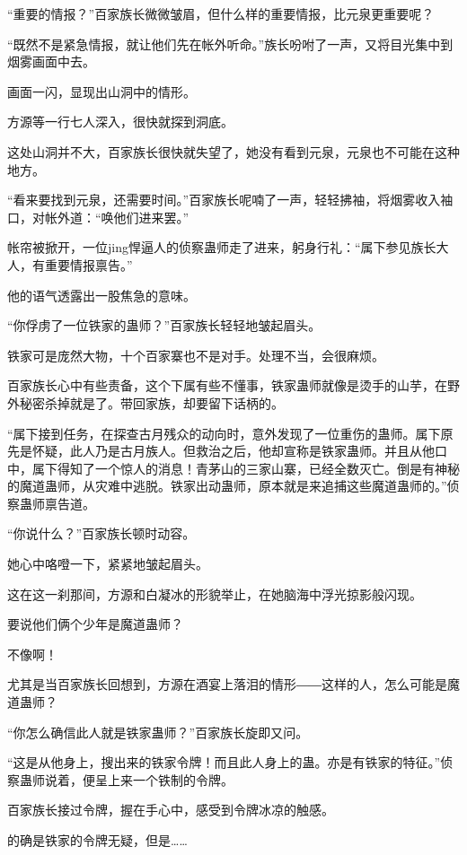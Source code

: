 
\begin{this_body}

“重要的情报？”百家族长微微皱眉，但什么样的重要情报，比元泉更重要呢？

“既然不是紧急情报，就让他们先在帐外听命。”族长吩咐了一声，又将目光集中到烟雾画面中去。

画面一闪，显现出山洞中的情形。

方源等一行七人深入，很快就探到洞底。

这处山洞并不大，百家族长很快就失望了，她没有看到元泉，元泉也不可能在这种地方。

“看来要找到元泉，还需要时间。”百家族长呢喃了一声，轻轻拂袖，将烟雾收入袖口，对帐外道：“唤他们进来罢。”

帐帘被掀开，一位jing悍逼人的侦察蛊师走了进来，躬身行礼：“属下参见族长大人，有重要情报禀告。”

他的语气透露出一股焦急的意味。

“你俘虏了一位铁家的蛊师？”百家族长轻轻地皱起眉头。

铁家可是庞然大物，十个百家寨也不是对手。处理不当，会很麻烦。

百家族长心中有些责备，这个下属有些不懂事，铁家蛊师就像是烫手的山芋，在野外秘密杀掉就是了。带回家族，却要留下话柄的。

“属下接到任务，在探查古月残众的动向时，意外发现了一位重伤的蛊师。属下原先是怀疑，此人乃是古月族人。但救治之后，他却宣称是铁家蛊师。并且从他口中，属下得知了一个惊人的消息！青茅山的三家山寨，已经全数灭亡。倒是有神秘的魔道蛊师，从灾难中逃脱。铁家出动蛊师，原本就是来追捕这些魔道蛊师的。”侦察蛊师禀告道。

“你说什么？”百家族长顿时动容。

她心中咯噔一下，紧紧地皱起眉头。

这在这一刹那间，方源和白凝冰的形貌举止，在她脑海中浮光掠影般闪现。

要说他们俩个少年是魔道蛊师？

不像啊！

尤其是当百家族长回想到，方源在酒宴上落泪的情形――这样的人，怎么可能是魔道蛊师？

“你怎么确信此人就是铁家蛊师？”百家族长旋即又问。

“这是从他身上，搜出来的铁家令牌！而且此人身上的蛊。亦是有铁家的特征。”侦察蛊师说着，便呈上来一个铁制的令牌。

百家族长接过令牌，握在手心中，感受到令牌冰凉的触感。

的确是铁家的令牌无疑，但是……


\end{this_body}
